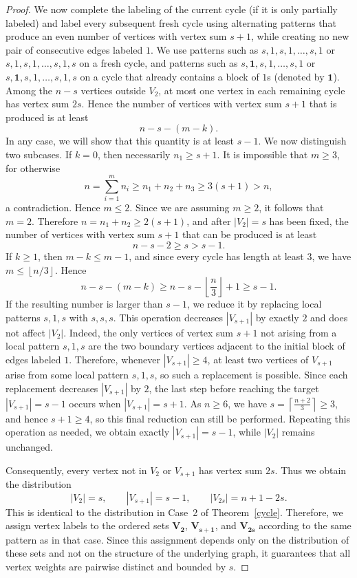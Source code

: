 \documentclass[10pt,a4paper]{amsart}
\begin{document}
\begin{proof}
We now complete the labeling of the current cycle (if it is only partially labeled) and label every subsequent fresh cycle using alternating patterns that produce an even number of vertices with vertex sum $s+1$, while creating no new pair of consecutive edges labeled $1$. We use patterns such as $s,1,s,1,\ldots,s,1$ or $s,1,s,1,\ldots,s,1,s$ on a fresh cycle, and patterns such as $s,\mathbf{1},s,1,\ldots,s,1$ or $s,\mathbf{1},s,1,\ldots,s,1,s$ on a cycle that already contains a block of $1$s (denoted by $\mathbf{1}$). Among the \(n-s\) vertices outside \(V_2\), at most one vertex in each remaining cycle has vertex sum \(2s\). Hence the number of vertices with vertex sum \(s+1\) that is produced is at least
\[
n-s-(m-k).
\]
In any case, we will show that this quantity is at least \(s-1\). We now distinguish two subcases. If \(k=0\), then necessarily \(n_1\ge s+1\). It is impossible that \(m\ge 3\), for otherwise
\[
n=\sum_{i=1}^m n_i \ge n_1+n_2+n_3 \ge 3(s+1)>n,
\]
a contradiction. Hence \(m\le 2\). Since we are assuming \(m\ge 2\), it follows that \(m=2\). Therefore \(n=n_1+n_2\ge 2(s+1)\), and after \(|V_2|=s\) has been fixed, the number of vertices with vertex sum \(s+1\) that can be produced is at least
\[
n-s-2\ge s>s-1.
\]
If \(k\ge 1\), then \(m-k\le m-1\), and since every cycle has length at least \(3\), we have \(m\le \left\lfloor n/3 \right\rfloor\). Hence
\[
n-s-(m-k)\ge n-s-\left\lfloor \frac n3 \right\rfloor +1 \ge s-1.
\]
If the resulting number is larger than \(s-1\), we reduce it by replacing local patterns \(s,1,s\) with \(s,s,s\). This operation decreases \(|V_{s+1}|\) by exactly \(2\) and does not affect \(|V_2|\). Indeed, the only vertices of vertex sum \(s+1\) not arising from a local pattern \(s,1,s\) are the two boundary vertices adjacent to the initial block of edges labeled \(1\). Therefore, whenever \(|V_{s+1}|\ge 4\), at least two vertices of \(V_{s+1}\) arise from some local pattern \(s,1,s\), so such a replacement is possible. Since each replacement decreases \(|V_{s+1}|\) by \(2\), the last step before reaching the target \(|V_{s+1}|=s-1\) occurs when \(|V_{s+1}|=s+1\). As \(n\ge 6\), we have \(s=\left\lceil\frac{n+2}{3}\right\rceil\ge 3\), and hence \(s+1\ge 4\), so this final reduction can still be performed. Repeating this operation as needed, we obtain exactly \(|V_{s+1}|=s-1\), while \(|V_2|\) remains unchanged.

Consequently, every vertex not in \(V_2\) or \(V_{s+1}\) has vertex sum \(2s\). Thus we obtain the distribution
\[
|V_2|=s,\qquad |V_{s+1}|=s-1,\qquad |V_{2s}|=n+1-2s.
\]
This is identical to the distribution in Case~2 of Theorem~\ref{cycle}. Therefore, we assign vertex labels to the ordered sets \(\mathbf{V_2}\), \(\mathbf{V_{s+1}}\), and \(\mathbf{V_{2s}}\) according to the same pattern as in that case. Since this assignment depends only on the distribution of these sets and not on the structure of the underlying graph, it guarantees that all vertex weights are pairwise distinct and bounded by $s$.


\end{proof}
\end{document}
